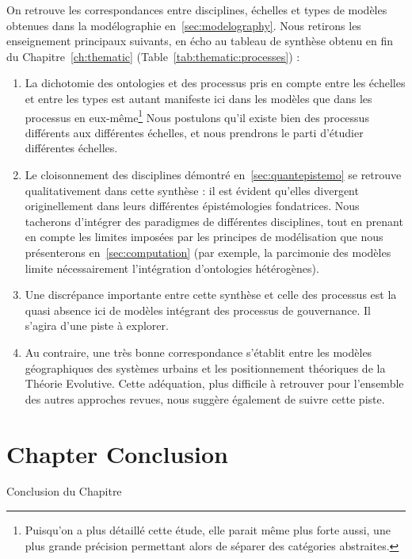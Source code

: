 On retrouve les correspondances entre disciplines, échelles et types de modèles obtenues dans la modélographie en~\ref{sec:modelography}. Nous retirons les enseignement principaux suivants, en écho au tableau de synthèse obtenu en fin du Chapitre~\ref{ch:thematic} (Table~\ref{tab:thematic:processes}) :
\begin{enumerate}
	\item La dichotomie des ontologies et des processus pris en compte entre les échelles et entre les types est autant manifeste ici dans les modèles que dans les processus en eux-même\footnote{Puisqu'on a plus détaillé cette étude, elle parait même plus forte aussi, une plus grande précision permettant alors de séparer des catégories abstraites.} Nous postulons qu'il existe bien des processus différents aux différentes échelles, et nous prendrons le parti d'étudier différentes échelles.
	\item Le cloisonnement des disciplines démontré en~\ref{sec:quantepistemo} se retrouve qualitativement dans cette synthèse : il est évident qu'elles divergent originellement dans leurs différentes épistémologies fondatrices. Nous tacherons d'intégrer des paradigmes de différentes disciplines, tout en prenant en compte les limites imposées par les principes de modélisation que nous présenterons en~\ref{sec:computation} (par exemple, la parcimonie des modèles limite nécessairement l'intégration d'ontologies hétérogènes).
	\item Une discrépance importante entre cette synthèse et celle des processus est la quasi absence ici de modèles intégrant des processus de gouvernance. Il s'agira d'une piste à explorer.
	\item Au contraire, une très bonne correspondance s'établit entre les modèles géographiques des systèmes urbains et les positionnement théoriques de la Théorie Evolutive. Cette adéquation, plus difficile à retrouver pour l'ensemble des autres approches revues, nous suggère également de suivre cette piste.
\end{enumerate}







\newpage


\section*{Chapter Conclusion}{Conclusion du Chapitre}

